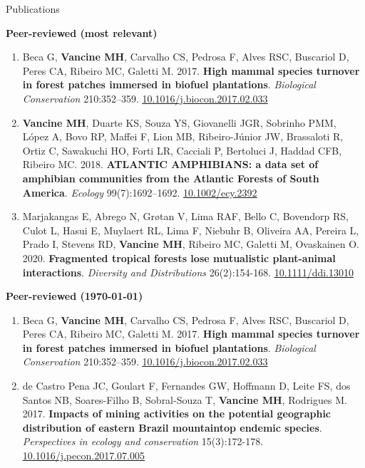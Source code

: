 \documentclass{resume}
\begin{document}
\begin{rSection}{Publications}

{\bf Peer-reviewed (most relevant)}

\begin{enumerate} 

\item Beca G, {\bf Vancine MH}, Carvalho CS, Pedrosa F, Alves RSC, Buscariol D, Peres CA, Ribeiro MC, Galetti M. 2017. {\bf High mammal species turnover in forest patches immersed in biofuel plantations}. {\it Biological Conservation} 210:352–359. \href{https://doi.org/10.1016/j.biocon.2017.02.033}{\underline{10.1016/j.biocon.2017.02.033}}

\item {\bf Vancine MH}, Duarte KS, Souza YS, Giovanelli JGR, Sobrinho PMM, López A, Bovo RP, Maffei F, Lion MB, Ribeiro-Júnior JW, Brassaloti R, Ortiz C, Sawakuchi HO, Forti LR, Cacciali P, Bertoluci J, Haddad CFB, Ribeiro MC. 2018. {\bf ATLANTIC AMPHIBIANS: a data set of amphibian communities from the Atlantic Forests of South America}. {\it Ecology} 99(7):1692–1692. \href{https://doi.org/10.1002/ecy.2392}{\underline{10.1002/ecy.2392}}

\item Marjakangas E, Abrego N, Grøtan V, Lima RAF, Bello C, Bovendorp RS, Culot L, Hasui E, Muylaert RL, Lima F, Niebuhr B, Oliveira AA, Pereira L, Prado I, Stevens RD, {\bf Vancine MH}, Ribeiro MC, Galetti M, Ovaskainen O. 2020. {\bf Fragmented tropical forests lose mutualistic plant-animal interactions}. {\it Diversity and Distributions} 26(2):154-168. \href{https://doi.org/10.1111/ddi.13010}{\underline{10.1111/ddi.13010}}

\end{enumerate} 

{\bf Peer-reviewed (\today)}

\begin{enumerate} 
\item Beca G, {\bf Vancine MH}, Carvalho CS, Pedrosa F, Alves RSC, Buscariol D, Peres CA, Ribeiro MC, Galetti M. 2017. {\bf High mammal species turnover in forest patches immersed in biofuel plantations}. {\it Biological Conservation} 210:352–359. \href{https://doi.org/10.1016/j.biocon.2017.02.033}{\underline{10.1016/j.biocon.2017.02.033}}

\item de Castro Pena JC, Goulart F, Fernandes GW, Hoffmann D, Leite FS, dos Santos NB, Soares-Filho B, Sobral-Souza T, {\bf Vancine MH}, Rodrigues M. 2017. {\bf Impacts of mining activities on the potential geographic distribution of eastern Brazil mountaintop endemic species}. {\it Perspectives in ecology and conservation} 15(3):172-178. \href{https://doi.org/10.1016/j.pecon.2017.07.005}{\underline{10.1016/j.pecon.2017.07.005}}


\end{enumerate}
\end{rSection}
\end{document}
